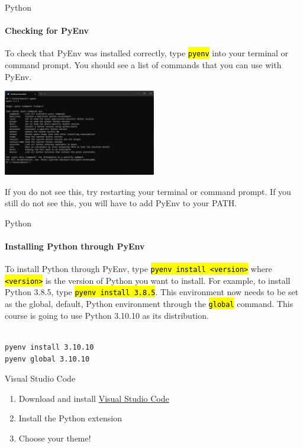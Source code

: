 \documentclass[
    aspectratio=169, 
    usepdftitle=false, 
    xcolor={dvipsnames},
    hyperref={
        colorlinks,
        linkcolor=black,
        urlcolor=blue}
    ]{beamer}
\let\OldTexttt\texttt
\renewcommand{\texttt}[1]{\OldTexttt{\hl{#1}}}%
\begin{document}
\begin{frame}[fragile]{Python}
    \framesubtitle{Checking for PyEnv}

    To check that PyEnv was installed correctly, type \texttt{pyenv} into your terminal or command prompt. You should see a list of commands that you can use with PyEnv.

    \begin{center}
        \includegraphics[width=0.5\textwidth]{pyenv_terminal.jpg}
    \end{center}

    If you do not see this, try restarting your terminal or command prompt. If you still do not see this, you will have to add PyEnv to your PATH.
\end{frame}

\begin{frame}[fragile]{Python}
    \framesubtitle{Installing Python through PyEnv}

    To install Python through PyEnv, type \texttt{pyenv install <version>} where \texttt{<version>} is the version of Python you want to install. For example, to install Python 3.8.5, type \texttt{pyenv install 3.8.5}. This environment now needs to be set as the global, default, Python environment through the \texttt{global} command. This course is going to use Python 3.10.10 as its distribution.\\~\

    \begin{lstlisting}
pyenv install 3.10.10
pyenv global 3.10.10
    \end{lstlisting}
\end{frame}

\begin{frame}{Visual Studio Code}
    \begin{enumerate}
        \item Download and install \href{https://code.visualstudio.com/download}{Visual Studio Code}
        \item Install the Python extension
        \item Choose your theme! 
    \end{enumerate}
\end{frame}
\end{document}
